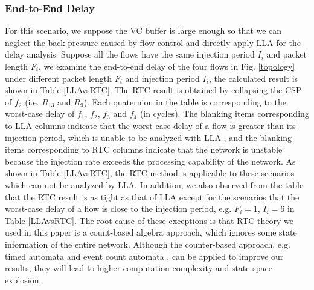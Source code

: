 \documentclass[10pt,journal]{IEEEtran}
\begin{document}
\subsubsection{End-to-End Delay}
For this scenario, we suppose the VC buffer is large enough so that we can neglect the back-pressure caused by flow control and directly apply LLA for the delay analysis. Suppose all the flows have the same injection period $I_i$ and packet length $F_i$, we examine the end-to-end delay of the four flows in Fig. \ref{topology} under different packet length $F_i$ and injection period $I_i$, the calculated result is shown in Table \ref{LLAvsRTC}. The RTC result is obtained by collapsing the CSP of $f_2$ (i.e. $R_{13}$ and $R_{9}$). Each quaternion in the table is corresponding to the worst-case delay of $f_1$, $f_2$, $f_3$ and $f_4$ (in cycles). The blanking items corresponding to LLA columns indicate that the worst-case delay of a flow is greater than its injection period, which is unable to be analyzed with LLA \cite{73}\cite{189}, and the blanking items corresponding to RTC columns indicate that the network is unstable because the injection rate exceeds the processing capability of the network. As shown in Table \ref{LLAvsRTC}, the RTC method is applicable to these scenarios which can not be analyzed by LLA. In addition, we also observed from the table that the RTC result is as tight as that of LLA except for the scenarios that the worst-case delay of a flow is close to the injection period, e.g. $F_i=1$, $I_i=6$ in Table \ref{LLAvsRTC}. The root cause of these exceptions is that RTC theory we used in this paper is a count-based algebra approach, which ignores some state information of the entire network. Although the counter-based approach, e.g. timed automata \cite{Fersman2006301} and event count automata \cite{Chakraborty:2005:ECA:1106608.1106642}, can be applied to improve our results, they will lead to higher computation complexity and state space explosion.
\end{document}

